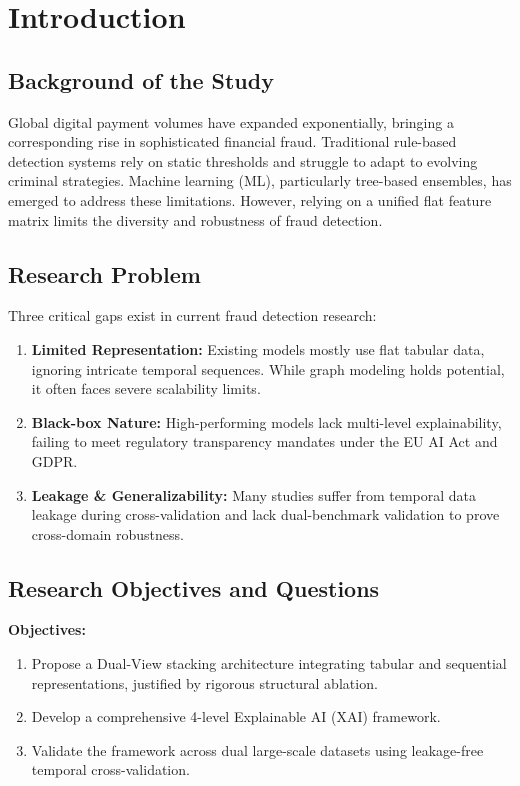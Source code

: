 \documentclass[10pt,a4paper,twocolumn]{article}
\begin{document}
\section{Introduction}
\subsection{Background of the Study}
Global digital payment volumes have expanded exponentially, bringing a corresponding rise in sophisticated financial fraud. Traditional rule-based detection systems rely on static thresholds and struggle to adapt to evolving criminal strategies. Machine learning (ML), particularly tree-based ensembles, has emerged to address these limitations. However, relying on a unified flat feature matrix limits the diversity and robustness of fraud detection.

\subsection{Research Problem}
Three critical gaps exist in current fraud detection research:
\begin{enumerate}
    \item \textbf{Limited Representation:} Existing models mostly use flat tabular data, ignoring intricate temporal sequences. While graph modeling holds potential, it often faces severe scalability limits.
    \item \textbf{Black-box Nature:} High-performing models lack multi-level explainability, failing to meet regulatory transparency mandates under the EU AI Act \cite{euaiact2024} and GDPR.
    \item \textbf{Leakage \& Generalizability:} Many studies suffer from temporal data leakage during cross-validation and lack dual-benchmark validation to prove cross-domain robustness.
\end{enumerate}

\subsection{Research Objectives and Questions}
\textbf{Objectives:}
\begin{enumerate}
    \item Propose a Dual-View stacking architecture integrating tabular and sequential representations, justified by rigorous structural ablation.
    \item Develop a comprehensive 4-level Explainable AI (XAI) framework.
    \item Validate the framework across dual large-scale datasets using leakage-free temporal cross-validation.
\end{enumerate}
\end{document}
